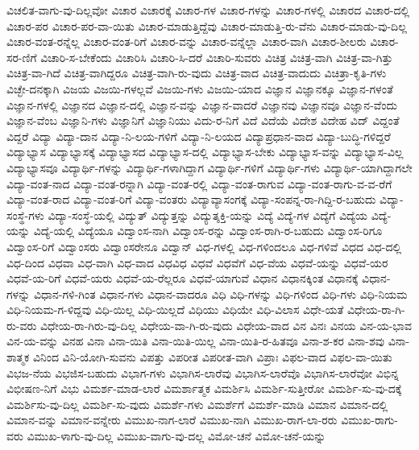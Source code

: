 {ವಿಚಲಿತ-ವಾಗು-ವು-ದಿಲ್ಲವೋ
ವಿಚಾರ
ವಿಚಾರಕ್ಕೆ
ವಿಚಾರ-ಗಳ
ವಿಚಾರ-ಗಳನ್ನು
ವಿಚಾರ-ಗಳಲ್ಲಿ
ವಿಚಾರದ
ವಿಚಾರ-ದಲ್ಲಿ
ವಿಚಾರ-ಪರ
ವಿಚಾರ-ಪರ-ವಾ-ಯಿತು
ವಿಚಾರ-ಮಾಡುತ್ತಿದ್ದೆವು
ವಿಚಾರ-ಮಾಡುತ್ತಿ-ರು-ವೆನು
ವಿಚಾರ-ಮಾಡು-ವು-ದಿಲ್ಲ
ವಿಚಾರ-ವಂತ-ರನ್ನೆಲ್ಲ
ವಿಚಾರ-ವಂತ-ರಿಗೆ
ವಿಚಾರ-ವನ್ನು
ವಿಚಾರ-ವನ್ನೆಲ್ಲಾ
ವಿಚಾರ-ವಾಗಿ
ವಿಚಾರ-ಶೀಲರು
ವಿಚಾರ-ಸರ-ಣಿಗೆ
ವಿಚಾರಿ-ಸ-ಬೇಕೆಂದು
ವಿಚಾರಿಸಿ
ವಿಚಾರಿ-ಸಿ-ದರೆ
ವಿಚಾರಿ-ಸುವರು
ವಿಚಿತ್ರ
ವಿಚಿತ್ರ-ವಾಗಿ
ವಿಚಿತ್ರ-ವಾ-ಗಿತ್ತು
ವಿಚಿತ್ರ-ವಾ-ಗಿದೆ
ವಿಚಿತ್ರ-ವಾಗಿದ್ದರೂ
ವಿಚಿತ್ರ-ವಾಗಿ-ರು-ವುದು
ವಿಚಿತ್ರ-ವಾದ
ವಿಚಿತ್ರ-ವಾದುದು
ವಿಚಿತ್ರಾ-ಕೃತಿ-ಗಳು
ವಿಚ್ಛೇ-ದನಕ್ಕಾಗಿ
ವಿಜಯ
ವಿಜಯಿ-ಗಳಲ್ಲವೆ
ವಿಜಯಿ-ಗಳು
ವಿಜಯಿ-ಯಾದ
ವಿಜ್ಞಾನ
ವಿಜ್ಞಾನಕ್ಕೂ
ವಿಜ್ಞಾನ-ಗಳಂತೆ
ವಿಜ್ಞಾನ-ಗಳಲ್ಲಿ
ವಿಜ್ಞಾನದ
ವಿಜ್ಞಾನ-ದಲ್ಲಿ
ವಿಜ್ಞಾನ-ವನ್ನು
ವಿಜ್ಞಾನ-ವಾದರೆ
ವಿಜ್ಞಾನವು
ವಿಜ್ಞಾನವೂ
ವಿಜ್ಞಾನ-ವೆಂದು
ವಿಜ್ಞಾನ-ವೆಂಬ
ವಿಜ್ಞಾನಿ-ಗಳು
ವಿಜ್ಞಾನಿಗೆ
ವಿಜ್ಞಾನಿಯು
ವಿದು-ರ-ನಿಗೆ
ವಿದೆ
ವಿದೆಯೆ
ವಿದೇಶ
ವಿದೇಹ
ವಿದ್
ವಿದ್ದಂತೆ
ವಿದ್ದರೆ
ವಿದ್ಯಾ
ವಿದ್ಯಾ-ದಾನ
ವಿದ್ಯಾ-ನಿ-ಲಯ-ಗಳಿಗೆ
ವಿದ್ಯಾ-ನಿ-ಲಯದ
ವಿದ್ಯಾಪ್ರಧಾನ-ವಾದ
ವಿದ್ಯಾ-ಬುದ್ಧಿ-ಗಳಿದ್ದರೆ
ವಿದ್ಯಾಭ್ಯಾಸ
ವಿದ್ಯಾಭ್ಯಾಸಕ್ಕೆ
ವಿದ್ಯಾಭ್ಯಾಸದ
ವಿದ್ಯಾಭ್ಯಾಸ-ದಲ್ಲಿ
ವಿದ್ಯಾಭ್ಯಾಸ-ಬೇಕು
ವಿದ್ಯಾಭ್ಯಾಸ-ವನ್ನು
ವಿದ್ಯಾಭ್ಯಾಸ-ವಿಲ್ಲ
ವಿದ್ಯಾಭ್ಯಾಸವೂ
ವಿದ್ಯಾರ್ಥಿ-ಗಳನ್ನು
ವಿದ್ಯಾರ್ಥಿ-ಗಳಾಗಿದ್ದಾಗ
ವಿದ್ಯಾರ್ಥಿ-ಗಳಿಗೆ
ವಿದ್ಯಾರ್ಥಿ-ಗಳು
ವಿದ್ಯಾರ್ಥಿ-ಯಾಗಿದ್ದಾಗಲೇ
ವಿದ್ಯಾ-ವಂತ-ನಾದ
ವಿದ್ಯಾ-ವಂತ-ರನ್ನಾಗಿ
ವಿದ್ಯಾ-ವಂತ-ರಲ್ಲಿ
ವಿದ್ಯಾ-ವಂತ-ರಾಗುವ
ವಿದ್ಯಾ-ವಂತ-ರಾಗು-ವ-ವ-ರೆಗೆ
ವಿದ್ಯಾ-ವಂತ-ರಾದ
ವಿದ್ಯಾ-ವಂತ-ರಿಗೆ
ವಿದ್ಯಾ-ವಂತರು
ವಿದ್ಯಾವ್ಯಾಸಂಗಕ್ಕೆ
ವಿದ್ಯಾ-ಸಂಪನ್ನ-ರಾ-ಗಿದ್ದಿ-ರ-ಬಹುದು
ವಿದ್ಯಾ-ಸಂಸ್ಥೆ-ಗಳು
ವಿದ್ಯಾ-ಸಂಸ್ಥೆ-ಯಲ್ಲಿ
ವಿದ್ಯುತ್
ವಿದ್ಯುತ್ತನ್ನು
ವಿದ್ಯುತ್ಶಕ್ತಿ-ಯನ್ನು
ವಿದ್ಯೆ
ವಿದ್ಯೆ-ಗಳ
ವಿದ್ಯೆಗೆ
ವಿದ್ಯೆಯ
ವಿದ್ಯೆ-ಯನ್ನು
ವಿದ್ಯೆ-ಯಲ್ಲಿ
ವಿದ್ಯೆಯೂ
ವಿದ್ವಾಂಸ-ನಾಗಿ
ವಿದ್ವಾಂಸ-ರನ್ನು
ವಿದ್ವಾಂಸ-ರಾಗಿ-ರ-ಬಹುದು
ವಿದ್ವಾಂಸ-ರಿಗೂ
ವಿದ್ವಾಂಸ-ರಿಗೆ
ವಿದ್ವಾಂಸರು
ವಿದ್ವಾಂಸರೇನೂ
ವಿದ್ವಾನ್
ವಿಧ-ಗಳಲ್ಲಿ
ವಿಧ-ಗಳಿಂದಲೂ
ವಿಧ-ಗಳಿವೆ
ವಿಧದ
ವಿಧ-ದಲ್ಲಿ
ವಿಧ-ದಿಂದ
ವಿಧವಾ
ವಿಧ-ವಾಗಿ
ವಿಧ-ವಾದ
ವಿಧವಿಧ
ವಿಧವೆ
ವಿಧವೆಗೆ
ವಿಧ-ವೆಯ
ವಿಧವೆ-ಯನ್ನು
ವಿಧವೆ-ಯರ
ವಿಧವೆ-ಯ-ರಿಗೆ
ವಿಧವೆ-ಯರು
ವಿಧವೆ-ಯ-ರೆಲ್ಲರೂ
ವಿಧವೆ-ಯಾಗುವೆ
ವಿಧಾನ
ವಿಧಾನಕ್ಕಿಂತ
ವಿಧಾನಕ್ಕೆ
ವಿಧಾನ-ಗಳನ್ನು
ವಿಧಾನ-ಗಳಿ-ಗಿಂತ
ವಿಧಾನ-ಗಳು
ವಿಧಾನ-ವಾದರೂ
ವಿಧಿ
ವಿಧಿ-ಗಳನ್ನು
ವಿಧಿ-ಗಳಿಂದ
ವಿಧಿ-ಗಳು
ವಿಧಿ-ನಿಯಮ
ವಿಧಿ-ನಿಯಮ-ಗ-ಳಿದ್ದವು
ವಿಧಿ-ಯಿಲ್ಲ
ವಿಧಿ-ಯಿಲ್ಲದೆ
ವಿಧಿಯು
ವಿಧಿಯೇ
ವಿಧಿ-ವಿಲಾಸ
ವಿಧೇ-ಯತೆ
ವಿಧೇಯ-ರಾ-ಗಿ-ರು-ವರು
ವಿಧೇಯ-ರಾ-ಗಿರು-ವು-ದಿಲ್ಲ
ವಿಧೇಯ-ವಾ-ಗಿ-ರು-ವುದು
ವಿಧೇಯ-ವಾದ
ವಿನ
ವಿನಃ
ವಿನಯ
ವಿನ-ಯ-ಭಾವ
ವಿನ-ಯ-ವನ್ನು
ವಿನಹ
ವಿನಾ
ವಿನಾ-ಯಿತಿ
ವಿನಾ-ಯಿತಿ-ಯಿಲ್ಲ
ವಿನಾ-ಯಿತಿ-ರ-ಹಿತವೂ
ವಿನಾ-ಶ-ಕರ
ವಿನಾ-ಶವು
ವಿನಾ-ಶಾತ್ಮಕ
ವಿನಿಂದ
ವಿನಿ-ಯೋಗಿ-ಸುವನು
ವಿಪತ್ತು
ವಿಪರೀತ
ವಿಪರೀತ-ವಾಗಿ
ವಿಪ್ರಾಃ
ವಿಫಲ-ವಾದ
ವಿಫಲ-ವಾ-ಯಿತು
ವಿಭಜ-ನೆಯ
ವಿಭಜಿಸ-ಬಹುದು
ವಿಭಾಗ-ಗಳು
ವಿಭಾಗಿಸ-ಲಾರೆವು
ವಿಭಾಗಿಸ-ಲಾರೆವೊ
ವಿಭಾಗಿಸ-ಲಾರೆವೋ
ವಿಭಿನ್ನ
ವಿಭೀಷಣ-ನಿಗೆ
ವಿಭು
ವಿಮರ್ಶ-ಮಾಡ-ಲಾರೆ
ವಿಮರ್ಶಾತ್ಮಕ
ವಿಮರ್ಶಿಸಿ
ವಿಮರ್ಶಿ-ಸುತ್ತೀರೋ
ವಿಮರ್ಶಿ-ಸು-ವು-ದಕ್ಕೆ
ವಿಮರ್ಶಿಸು-ವು-ದಿಲ್ಲ
ವಿಮರ್ಶಿ-ಸು-ವುದು
ವಿಮರ್ಶೆ-ಗಳು
ವಿಮರ್ಶೆಗೆ
ವಿಮರ್ಶೆ-ಮಾಡಿ
ವಿಮಾನ
ವಿಮಾನ-ದಲ್ಲಿ
ವಿಮಾನ-ವನ್ನು
ವಿಮಾನ-ವನ್ನೇರು
ವಿಮುಖ-ನಾಗ-ಲಾರೆ
ವಿಮುಖ-ನಾಗಿ
ವಿಮುಖ-ರಾಗ-ಲಾ-ರರು
ವಿಮುಖ-ರಾಗು-ವರು
ವಿಮುಖ-ಳಾಗು-ವು-ದಿಲ್ಲ
ವಿಮುಖ-ವಾಗು-ವು-ದಲ್ಲ
ವಿಮೋ-ಚನೆ
ವಿಮೋ-ಚನೆ-ಯನ್ನು
}
